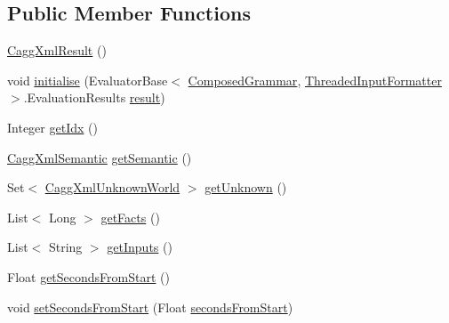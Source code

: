 \subsection*{Public Member Functions}
\begin{DoxyCompactItemize}
\item 
\hyperlink{classit_1_1emarolab_1_1cagg_1_1debugging_1_1result2XML_1_1CaggXmlResult_a11a8417b5531a4cb5380d12bb33eab48}{Cagg\-Xml\-Result} ()
\item 
void \hyperlink{classit_1_1emarolab_1_1cagg_1_1debugging_1_1result2XML_1_1CaggXmlResult_ad0b56e60ee505f9082f5753ac34490ac}{initialise} (Evaluator\-Base$<$ \hyperlink{classit_1_1emarolab_1_1cagg_1_1core_1_1evaluation_1_1interfacing_1_1ComposedGrammar}{Composed\-Grammar}, \hyperlink{classit_1_1emarolab_1_1cagg_1_1core_1_1evaluation_1_1inputFormatting_1_1ThreadedInputFormatter}{Threaded\-Input\-Formatter} $>$.Evaluation\-Results \hyperlink{classit_1_1emarolab_1_1cagg_1_1debugging_1_1result2XML_1_1CaggXmlResult_a1f6de5aff3f9182bc5fb6d2e802912e5}{result})
\item 
Integer \hyperlink{classit_1_1emarolab_1_1cagg_1_1debugging_1_1result2XML_1_1CaggXmlResult_a2b0456e04184423881b49e8db91c93da}{get\-Idx} ()
\item 
\hyperlink{classit_1_1emarolab_1_1cagg_1_1debugging_1_1result2XML_1_1CaggXmlSemantic}{Cagg\-Xml\-Semantic} \hyperlink{classit_1_1emarolab_1_1cagg_1_1debugging_1_1result2XML_1_1CaggXmlResult_af81ea140acaf1a6899fb8176c74cbefe}{get\-Semantic} ()
\item 
Set$<$ \hyperlink{classit_1_1emarolab_1_1cagg_1_1debugging_1_1result2XML_1_1CaggXmlUnknownWorld}{Cagg\-Xml\-Unknown\-World} $>$ \hyperlink{classit_1_1emarolab_1_1cagg_1_1debugging_1_1result2XML_1_1CaggXmlResult_a0768845ac149b55603fcc97efd9fd9d5}{get\-Unknown} ()
\item 
List$<$ Long $>$ \hyperlink{classit_1_1emarolab_1_1cagg_1_1debugging_1_1result2XML_1_1CaggXmlResult_a1b623c68983ba2fbdb8696ec6e63ecdd}{get\-Facts} ()
\item 
List$<$ String $>$ \hyperlink{classit_1_1emarolab_1_1cagg_1_1debugging_1_1result2XML_1_1CaggXmlResult_abc0b462625eaa8e479242978b085077a}{get\-Inputs} ()
\item 
Float \hyperlink{classit_1_1emarolab_1_1cagg_1_1debugging_1_1result2XML_1_1CaggXmlResult_a0274df8bca90a89b56dda6985fc149f0}{get\-Seconds\-From\-Start} ()
\item 
void \hyperlink{classit_1_1emarolab_1_1cagg_1_1debugging_1_1result2XML_1_1CaggXmlResult_a8fb1960ed50275a6737ff204d5bd6cc1}{set\-Seconds\-From\-Start} (Float \hyperlink{classit_1_1emarolab_1_1cagg_1_1debugging_1_1result2XML_1_1CaggXmlResult_ae7e5180b0239b507853d4dfe8e6b6708}{seconds\-From\-Start})

\end{DoxyCompactItemize}
